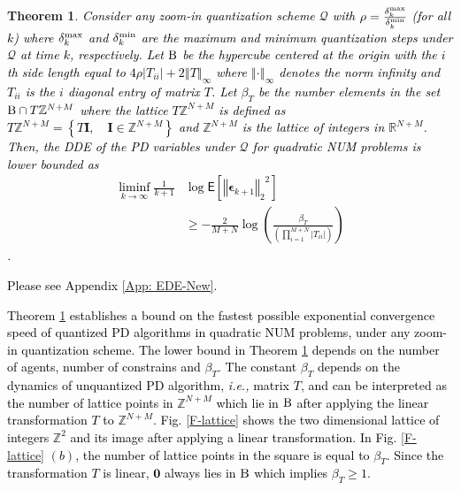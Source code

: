 \documentclass[10pt,twocolumn,twoside]{IEEEtran}
\newtheorem{theorem}{Theorem}
\begin{document}
\begin{theorem}\label{Theo: EDE-New}
\textcolor{black}{Consider  any zoom-in quantization scheme $\mathcal{Q}$ with $\rho=\frac{\delta^{\rm max}_k}{\delta^{\rm min}_k}$ (for all $k$) where $\delta^{\rm max}_k$ and $\delta^{\rm min}_k$ are the maximum and minimum quantization steps under $\mathcal{Q}$ at time $k$, respectively. Let ${\rm B}$ be the hypercube centered at the origin with the $i$th side length equal to $4\rho{\left|{T_{ii}}\right|}+2{\left\Vert{T}\right\Vert_{{\infty}}}$ where ${\left\Vert{\cdot}\right\Vert_{{\infty}}}$ denotes the norm infinity and $T_{ii}$ is the $i$ diagonal entry of matrix $T$. Let $\beta_T$ be the number elements in the set ${\rm B}\cap T{\ensuremath{{\ensuremath{\mathbb{{Z}}}}}}^{N+M}$ where the lattice $T{\ensuremath{{\ensuremath{\mathbb{{Z}}}}}}^{N+M}$ is defined as $T{\ensuremath{{\ensuremath{\mathbb{{Z}}}}}}^{N+M}=\left\{T{\ensuremath{\boldsymbol{{I}}}},\quad {\ensuremath{\boldsymbol{{I}}}}\in{\ensuremath{{\ensuremath{\mathbb{{Z}}}}}}^{N+M}\right\}$ and ${\ensuremath{{\ensuremath{\mathbb{{Z}}}}}}^{N+M}$ is the lattice of integers in ${\ensuremath{{\ensuremath{\mathbb{{R}}}}}}^{N+M}$. 
Then, the DDE of the PD variables  under $\mathcal{Q}$ for quadratic NUM problems is lower bounded as 
\begin{align}\label{Eq: EDE-New}
\liminf_{k\rightarrow\infty}\frac{1}{k+1}&\log{{\ensuremath{\mathsf{E}\left[{{\left\Vert{{\ensuremath{\boldsymbol{{\epsilon}}}}_{k+1}}\right\Vert_{{2}}}^2} \right]}}}\nonumber\\
&\geq -\frac{2}{M+N}{\ensuremath{\log{\left({{\frac{ \beta_T}{{\left({\prod_{i=1}^{M+N}{\left|{T_{ii}}\right|}}\right)}}}}\right)}}} 
\end{align}.}
\end{theorem}
\begin{IEEEproof}
\textcolor{black}{Please see Appendix \ref{App: EDE-New}.}
\end{IEEEproof}
\textcolor{black}{Theorem \ref{Theo: EDE-New} establishes a bound on the fastest possible exponential convergence speed of quantized PD algorithms in quadratic NUM problems, under any zoom-in quantization scheme. The lower bound in Theorem \ref{Theo: EDE-New} depends on the number of agents, number of constrains and $\beta_T$. The constant $\beta_T$ depends on the dynamics of unquantized PD algorithm, \emph{i.e.,} matrix $T$, and can be interpreted as the number of lattice points in ${\ensuremath{{\ensuremath{\mathbb{{Z}}}}}}^{N+M}$ which lie in ${\rm B}$ after applying the linear transformation $T$ to ${\ensuremath{{\ensuremath{\mathbb{{Z}}}}}}^{N+M}$. Fig. \ref{F-lattice} shows the two dimensional lattice of integers ${\ensuremath{{\ensuremath{\mathbb{{Z}}}}}}^2$ and its image after applying a linear transformation. In Fig. \ref{F-lattice} $(b)$, the number of lattice points in the square is equal to $\beta_T$. Since the transformation $T$ is linear, ${\ensuremath{\boldsymbol{{0}}}}$ always lies in ${\rm B}$ which implies $\beta_T\geq 1$.}
\end{document}
